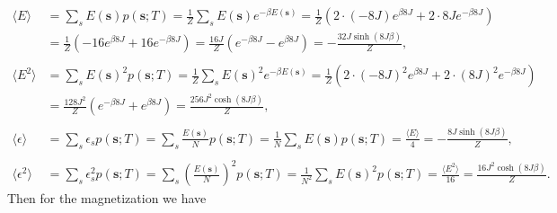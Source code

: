 \documentclass[english,notitlepage,reprint,nofootinbib]{revtex4-1}  %
\begin{document}
\begin{align*}
    \langle E \rangle          & =  \sum_s E(\textbf{s})  p(\textbf{s};T)
    = \frac{1}{Z} \sum_s E(\textbf{s})  e^{-\beta E(\textbf{s})}
    = \frac{1}{Z} \left( 2 \cdot (-8J)e^{\beta8J} + 2 \cdot 8J e^{-\beta 8J}\right)              \\
                               & = \frac{1}{Z} \left( -16 e^{\beta8J} + 16 e^{-\beta 8J}\right)
    = \frac{16J}{Z} \left( e^{-\beta 8J} - e^{\beta 8J} \right)
    = - \frac{32 J \sinh(8J \beta )}{Z},
    \\
    \\
    \langle E^2 \rangle        & =  \sum_s E(\textbf{s})^2  p(\textbf{s};T)
    = \frac{1}{Z} \sum_s E(\textbf{s})^2  e^{-\beta E(\textbf{s})}
    = \frac{1}{Z} \left( 2 \cdot (-8J)^2e^{\beta8J} + 2 \cdot (8J)^2 e^{-\beta 8J}\right)        \\
                               & = \frac{128 J^2}{Z} \left( e^{-\beta 8J} + e^{\beta 8J} \right)
    = \frac{256 J^2 \cosh(8J \beta)}{Z},
    \\
    \\
    \langle \epsilon \rangle   & =  \sum_s \epsilon_s  p(\textbf{s};T)
    =  \sum_s \frac{E(\textbf{s})}{N}  p(\textbf{s};T)
    =  \frac{1}{N} \sum_s E(\textbf{s})  p(\textbf{s};T)
    =  \frac{\langle E \rangle }{4}
    = - \frac{8J \sinh(8J \beta)}{Z},
    \\
    \\
    \langle \epsilon^2 \rangle & =  \sum_s \epsilon_s^2  p(\textbf{s};T)
    =  \sum_s \left(\frac{E(\textbf{s})}{N}\right)^2  p(\textbf{s};T)
    =  \frac{1}{N^2} \sum_s E(\textbf{s})^2  p(\textbf{s};T)
    =  \frac{\langle E^2 \rangle }{16}
    = \frac{16 J^2 \cosh(8J \beta)}{Z}.
\end{align*}
Then for the magnetization we have
\end{document}

